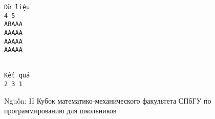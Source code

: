 \begin{verbatim}
Dữ liệu
4 5
АВААА
ААААА
ААААА
ААААА


Kết quả
2 3 1
\end{verbatim}

   Nguồn: II Кубок математико-механического факультета СПбГУ по программированию для школьников